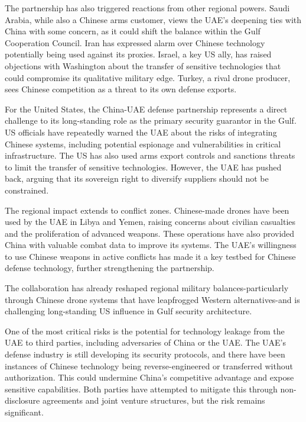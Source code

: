 \documentclass[10pt,a4paper]{article}
\begin{document}
{\small The partnership has also triggered reactions from other regional powers. Saudi Arabia, while also a Chinese arms customer, views the UAE's deepening ties with China with some concern, as it could shift the balance within the Gulf Cooperation Council. Iran has expressed alarm over Chinese technology potentially being used against its proxies. Israel, a key US ally, has raised objections with Washington about the transfer of sensitive technologies that could compromise its qualitative military edge. Turkey, a rival drone producer, sees Chinese competition as a threat to its own defense exports.}\par
{\small For the United States, the China-UAE defense partnership represents a direct challenge to its long-standing role as the primary security guarantor in the Gulf. US officials have repeatedly warned the UAE about the risks of integrating Chinese systems, including potential espionage and vulnerabilities in critical infrastructure. The US has also used arms export controls and sanctions threats to limit the transfer of sensitive technologies. However, the UAE has pushed back, arguing that its sovereign right to diversify suppliers should not be constrained.}\par
{\small The regional impact extends to conflict zones. Chinese-made drones have been used by the UAE in Libya and Yemen, raising concerns about civilian casualties and the proliferation of advanced weapons. These operations have also provided China with valuable combat data to improve its systems. The UAE's willingness to use Chinese weapons in active conflicts has made it a key testbed for Chinese defense technology, further strengthening the partnership.}\par
{\small The collaboration has already reshaped regional military balances-particularly through Chinese drone systems that have leapfrogged Western alternatives-and is challenging long-standing US influence in Gulf security architecture.}\par
{}\par\vspace{1pt}
{\small One of the most critical risks is the potential for technology leakage from the UAE to third parties, including adversaries of China or the UAE. The UAE's defense industry is still developing its security protocols, and there have been instances of Chinese technology being reverse-engineered or transferred without authorization. This could undermine China's competitive advantage and expose sensitive capabilities. Both parties have attempted to mitigate this through non-disclosure agreements and joint venture structures, but the risk remains significant.}\par
\end{document}
